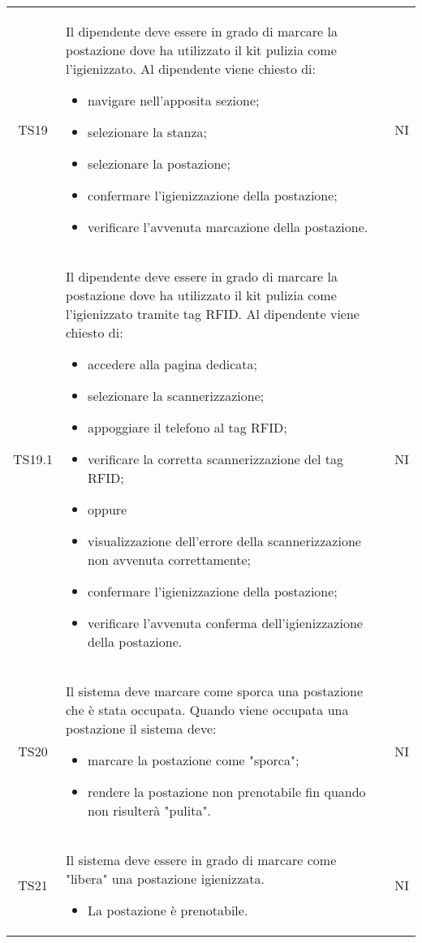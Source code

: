 {\begin{longtable}{ c C{11cm} c }
        TS19&
        Il dipendente deve essere in grado di marcare la postazione dove ha utilizzato il kit pulizia come l'igienizzato.\newline
        Al dipendente viene chiesto di:
        \begin{itemize}
            \item navigare nell'apposita sezione;
            \item selezionare la stanza;
            \item selezionare la postazione;
            \item confermare l'igienizzazione della postazione;
            \item verificare l'avvenuta marcazione della postazione.
        \end{itemize}&
        NI\\

        TS19.1&
        Il dipendente deve essere in grado di marcare la postazione dove ha utilizzato il kit pulizia come l'igienizzato tramite tag RFID.\newline
        Al dipendente viene chiesto di:
        \begin{itemize}
            \item accedere alla pagina dedicata;
            \item selezionare la scannerizzazione;
            \item appoggiare il telefono al tag RFID;
            \item verificare la corretta scannerizzazione del tag RFID;
            \item [] oppure
            \item visualizzazione dell'errore della scannerizzazione non avvenuta correttamente;
            \item confermare l'igienizzazione della postazione;
            \item verificare l'avvenuta conferma dell'igienizzazione della postazione.
        \end{itemize}&
        NI\\

        TS20&
        Il sistema deve marcare come sporca una postazione che \`{e} stata occupata.\newline
        Quando viene occupata una postazione il sistema deve:
        \begin{itemize}
            \item marcare la postazione come "sporca";
            \item rendere la postazione non prenotabile fin quando non risulter\`{a} "pulita".
        \end{itemize}&
        NI\\
        TS21&
        Il sistema deve essere in grado di marcare come "libera" una postazione igienizzata.\newline
        \begin{itemize}
            \item La postazione \`{e} prenotabile.
        \end{itemize}&
        NI\\
        
    \end{longtable}
}